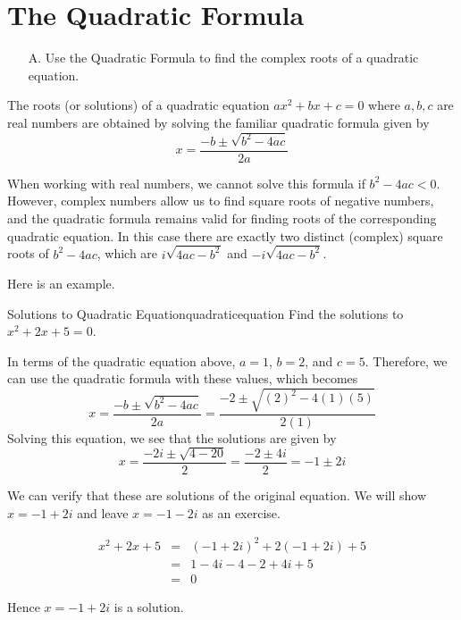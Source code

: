 \section{The Quadratic Formula}

\begin{outcome}
\begin{enumerate}
\item[A.] Use the Quadratic Formula to find the complex roots of a quadratic equation. 
\end{enumerate}
\end{outcome}

The roots (or solutions) of a quadratic equation $ax^{2}+bx+c=0$ where $a,b,c$ are real numbers are
obtained by solving the familiar quadratic formula
given by 
\begin{equation*}
x=
\frac{-b\pm \sqrt{b^{2}-4ac}}{2a}
\end{equation*}

When working with real numbers, we cannot solve this formula if
$b^{2}-4ac<0.$ However, complex numbers allow us to find square roots
of negative numbers, and the quadratic formula remains valid for
finding roots of the corresponding quadratic equation.   In this case
there are exactly two distinct (complex) square roots of $b^{2}-4ac$, which are 
$i\sqrt{4ac-b^{2}}$ and $-i\sqrt{4ac-b^{2}}$.

Here is an example. 

\begin{example}{Solutions to Quadratic Equation}{quadraticequation}
Find the solutions to $x^{2}+2x+5=0$.
\end{example}

\begin{solution}
In terms of the quadratic equation above, $a=1$, $b=2$, and $c=5$.
Therefore, we can use the quadratic formula with these values, which becomes
\begin{equation*}
x=
\frac{-b\pm \sqrt{b^{2}-4ac}}{2a}
= 
\frac{-2 \pm \sqrt{\left(2\right)^{2} - 4 (1)(5)}}{2(1)}
\end{equation*}
Solving this equation, we see that the solutions are given by
\begin{equation*}
x=\frac{-2i\pm \sqrt{4-20}}{2}=\frac{-2\pm 4i}{2}=-1\pm 2i
\end{equation*}

We can verify that these are solutions of the original equation. 
We will show $x = -1+2i$ and leave $x = -1-2i$ as an exercise.

\begin{eqnarray*}
x^{2}+2x+5
&=& (-1+2i)^2 + 2(-1+2i) + 5 \\
&=& 1 - 4i - 4 -2 + 4i + 5 \\
&=& 0
\end{eqnarray*}

Hence $x = -1+2i$ is a solution. 
\end{solution}

